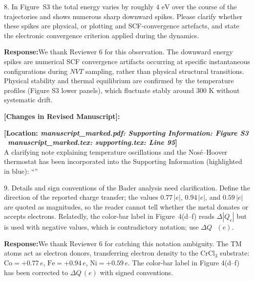 \documentclass[11pt, sans, a4paper]{moderncv}
\newcommand{\response}{\vspace{0.4em}\noindent\textbf{\color{actionblue}Response:}\hspace{0.5em}}
\newcommand{\manuscriptchange}[1]{{\renewcommand{\label}[1]{}\vspace{0.4em}\noindent\textbf{\color{acsblue}[Changes in Revised Manuscript]:}\par\nopagebreak\vspace{0.15em}#1\vspace{0.4em}}}
\begin{document}
\vspace{0.8em}

\begin{reviewercomment}
8. In Figure~S3 the total energy varies by roughly $4\text{ eV}$ over the course of the trajectories and shows numerous sharp downward spikes. Please clarify whether these spikes are physical, or plotting and SCF-convergence artefacts, and state the electronic convergence criterion applied during the dynamics.
\end{reviewercomment}

\response We thank Reviewer 6 for this observation. The downward energy spikes are numerical SCF convergence artifacts occurring at specific instantaneous configurations during $NVT$ sampling, rather than physical structural transitions. Physical stability and thermal equilibrium are confirmed by the temperature profiles (Figure S3 lower panels), which fluctuate stably around 300 K without systematic drift.

\manuscriptchange{\textbf{[Location: \textit{manuscript\_marked.pdf: Supporting Information: Figure S3} \textbar\ \textit{manuscript\_marked.tex: supporting.tex: Line 95}]}\\ A clarifying note explaining temperature oscillations and the Nos\'e--Hoover thermostat has been incorporated into the Supporting Information (highlighted in blue): ``{\itshape \ExecuteMetaData[supporting.tex]{FigureS3Caption}}''}

\vspace{0.8em}

\begin{reviewercomment}
9. Details and sign conventions of the Bader analysis need clarification. Define the direction of the reported charge transfer; the values $0.77\,|e|$, $0.94\,|e|$, and $0.59\,|e|$ are quoted as magnitudes, so the reader cannot tell whether the metal donates or accepts electrons. Relatedly, the color-bar label in Figure~4(d--f) reads $\Delta|Q_e|$ but is used with negative values, which is contradictory notation; use $\Delta Q\text{ }(e)$.
\end{reviewercomment}

\response We thank Reviewer 6 for catching this notation ambiguity. The TM atoms act as electron donors, transferring electron density to the $\text{CrCl}_3$ substrate: $\text{Co} = +0.77\,e$, $\text{Fe} = +0.94\,e$, $\text{Ni} = +0.59\,e$. The color-bar label in Figure 4(d--f) has been corrected to $\Delta Q\,(e)$ with signed conventions.
\end{document}
